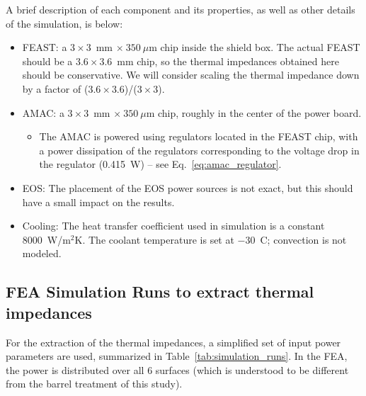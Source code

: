 \def\thcc{\ensuremath{\overline{T}_\text{nHCC}}}
\def\tabc{\ensuremath{\overline{T}_\text{nABC}}}
\def\tfeast{\ensuremath{\overline{T}_\text{FEAST}}}
\def\tsensor{\ensuremath{T_\text{sensor}}}
\def\Rm{\ensuremath{{\text{R}m}}}

A brief description of each component and its properties, as well as other details
of the simulation, is below:
\begin{itemize}
\item FEAST: a $3\times3$~mm $\times~350~\mu$m chip inside the shield box. The actual FEAST should be
a $3.6\times3.6$~mm chip, so the thermal impedances obtained here should be conservative. We will 
consider scaling the thermal impedance down by a factor of ($3.6\times3.6$)/($3\times3$).
\item AMAC: a $3\times3$~mm $\times~350~\mu$m chip, roughly in the center of the power board.
  \begin{itemize}
    \item The AMAC is powered using regulators located in the FEAST chip, with a power dissipation
      of the regulators corresponding to the voltage drop in the regulator (0.415~W) -- see Eq.~\ref{eq:amac_regulator}.
  \end{itemize}
\item EOS: The placement of the EOS power sources is not exact, but this should have a small impact
  on the results.
\item Cooling: The heat transfer coefficient used in simulation is a constant 8000~W/m$^{2}$K.
  The coolant temperature is set at $-30$~C; convection is not modeled.
\end{itemize}




\subsection{FEA Simulation Runs to extract thermal impedances}

For the extraction of the thermal impedances, a simplified set of input power parameters are used,
summarized in Table~\ref{tab:simulation_runs}.
In the FEA, the power is distributed over all 6 surfaces (which is understood to be different from
the barrel treatment of this study).

